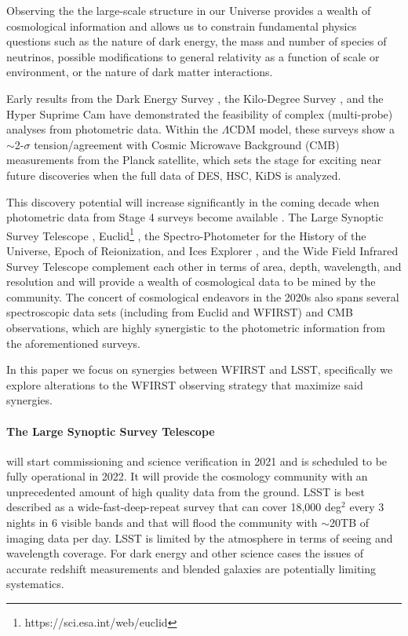 \documentclass[fleqn,usenatbib,useAMS]{mnras}
\begin{document}
Observing the the large-scale structure in our Universe provides a wealth of cosmological information and allows us to constrain fundamental physics questions such as the nature of dark energy, the mass and number of species of neutrinos, possible modifications to general relativity as a function of scale or environment, or the nature of dark matter interactions. 


Early results from the Dark Energy Survey \citep[DES\footnote{www.darkenergysurvey.org/},][]{kez17, tmz18, DES3x2,DES5x2}, the Kilo-Degree Survey \citep[KiDS\footnote{http://www.astro-wise.org/projects/KIDS/},][]{ujs18,hkb18,khd19}, and the Hyper Suprime Cam \citep[HSC\footnote{http://www.naoj.org/Projects/HSC/HSCProject.html},][]{hoh19,hsm19} have demonstrated the feasibility of complex (multi-probe) analyses from photometric data. Within the $\Lambda$CDM model, these surveys show a $\sim$2-$\sigma$ tension/agreement with Cosmic Microwave Background (CMB) measurements from the Planck satellite, which sets the stage for exciting near future discoveries when the full data of DES, HSC, KiDS is analyzed.  

This discovery potential will increase significantly in the coming decade when photometric data from Stage 4 surveys become available \citep[see][for a review]{wme13}. The Large Synoptic Survey Telescope \citep[LSST\footnote{https://www.lsst.org/},][]{2009arXiv0912.0201L}, Euclid\footnote{https://sci.esa.int/web/euclid} \citep{laa11}, the Spectro-Photometer for the History of the Universe, Epoch of Reionization, and Ices Explorer \citep[SPHEREx\footnote{http://spherex.caltech.edu/},][]{dba14}, and the Wide Field Infrared Survey Telescope \citep[WFIRST\footnote{https://wfirst.gsfc.nasa.gov/},][]{sgb15} complement each other in terms of area, depth, wavelength, and resolution and will provide a wealth of cosmological data to be mined by the community. The concert of cosmological endeavors in the 2020s also spans several spectroscopic data sets (including from Euclid and WFIRST) and CMB observations, which are highly synergistic to the photometric information from the aforementioned surveys. 

In this paper we focus on synergies between WFIRST and LSST, specifically we explore alterations to the WFIRST observing strategy that maximize said synergies. 

\paragraph*{The Large Synoptic Survey Telescope} will start commissioning and science verification in 2021 and is scheduled to be fully operational in 2022. It will provide the cosmology community with an unprecedented amount of high quality data from the ground. LSST is best described as a wide-fast-deep-repeat survey that can cover 18,000 deg$^2$ every 3 nights in 6 visible bands and that will flood the community with $\sim$20TB of imaging data per day. LSST is limited by the atmosphere in terms of seeing and wavelength coverage. For dark energy and other science cases the issues of accurate redshift measurements and blended galaxies \citep{2016ApJ...816...11D} are  potentially limiting systematics.  
\end{document}
